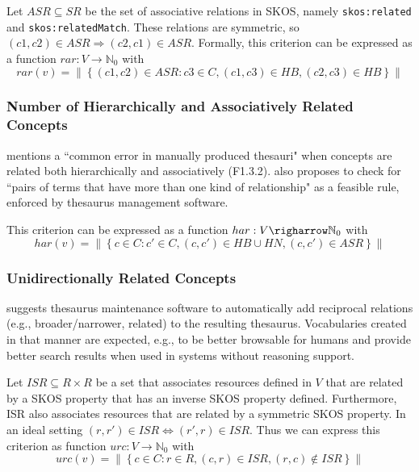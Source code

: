 \documentclass{llncs}
\begin{document}
\begin{definition}
Let \(ASR \subseteq SR\) be the set of associative relations in SKOS, namely \texttt{skos:related} and \texttt{skos:relatedMatch}. These relations are symmetric, so \((c1,c2) \in ASR \Rightarrow (c2,c1) \in ASR\). Formally, this criterion can be expressed as a function \(rar:V \rightarrow \mathbb{N}_{0}\) with \[rar(v)=\left\|\left\{(c1,c2) \in ASR : c3 \in C, (c1,c3) \in HB, (c2,c3) \in HB\right\}\right\|\]
\end{definition}

\subsubsection{Number of Hierarchically and Associatively Related Concepts} \cite{Aitchison2000} mentions a ``common error in manually produced thesauri" when concepts are related both hierarchically and associatively (F1.3.2). \cite{Hedden2010} also proposes to check for ``pairs of terms that have more than one kind of relationship" as a feasible rule, enforced by thesaurus management software.

\begin{definition}
This criterion can be expressed as a function \(har:V \righarrow \mathbb{N}_{0}\) with \[har(v)=\left\|\left\{c \in C : c' \in C, (c,c') \in HB \cup HN, (c,c') \in ASR\right\}\right\|\]
\end{definition}

\subsubsection{Unidirectionally Related Concepts} \cite{Z39.19:2005} suggests thesaurus maintenance software to automatically add reciprocal relations (e.g., broader/narrower, related) to the resulting thesaurus. Vocabularies created in that manner are expected, e.g., to be better browsable for humans and provide better search results when used in systems without reasoning support.

\begin{definition}
Let \(ISR \subseteq R \times R\) be a set that associates resources defined in \(V\) that are related by a SKOS property that has an inverse SKOS property defined. Furthermore, ISR also associates resources that are related by a symmetric SKOS property. In an ideal setting \((r,r') \in ISR \iff (r',r) \in ISR\). Thus we can express this criterion as function \(urc:V \rightarrow \mathbb{N}_{0}\) with \[urc(v)=\left\|\left\{c \in C : r \in R, (c,r) \in ISR, (r,c) \notin ISR\right\}\right\|\]
\end{definition}
\end{document}
